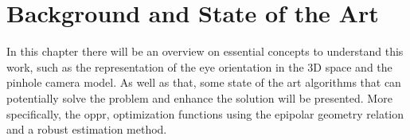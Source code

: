 
\chapter{Background and State of the Art}
\label{backgroundandsota}

In this chapter there will be an overview on essential concepts to understand this work, such as the representation of the eye orientation in the 3D space and the pinhole camera model. As well as that, some state of the art algorithms that can potentially solve the problem and enhance the solution will be presented. More specifically, the \acrlong{oppr}, optimization functions using the epipolar geometry relation and a robust estimation method.







